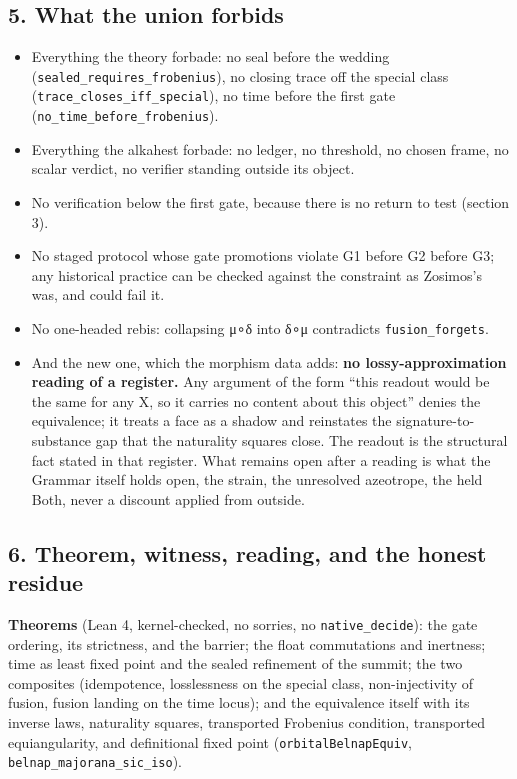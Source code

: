 \hypertarget{what-the-union-forbids}{%
\subsection{5. What the union forbids}\label{what-the-union-forbids}}

\begin{itemize}
\tightlist
\item
  Everything the theory forbade: no seal before the wedding
  (\texttt{sealed\_requires\_frobenius}), no closing trace off the
  special class (\texttt{trace\_closes\_iff\_special}), no time before
  the first gate (\texttt{no\_time\_before\_frobenius}).
\item
  Everything the alkahest forbade: no ledger, no threshold, no chosen
  frame, no scalar verdict, no verifier standing outside its object.
\item
  No verification below the first gate, because there is no return to
  test (section 3).
\item
  No staged protocol whose gate promotions violate G1 before G2 before
  G3; any historical practice can be checked against the constraint as
  Zosimos's was, and could fail it.
\item
  No one-headed rebis: collapsing μ∘δ into δ∘μ contradicts
  \texttt{fusion\_forgets}.
\item
  And the new one, which the morphism data adds: \textbf{no
  lossy-approximation reading of a register.} Any argument of the form
  ``this readout would be the same for any X, so it carries no content
  about this object'' denies the equivalence; it treats a face as a
  shadow and reinstates the signature-to-substance gap that the
  naturality squares close. The readout is the structural fact stated in
  that register. What remains open after a reading is what the Grammar
  itself holds open, the strain, the unresolved azeotrope, the held
  Both, never a discount applied from outside.
\end{itemize}

\hypertarget{theorem-witness-reading-and-the-honest-residue}{%
\subsection{6. Theorem, witness, reading, and the honest
residue}\label{theorem-witness-reading-and-the-honest-residue}}

\textbf{Theorems} (Lean 4, kernel-checked, no sorries, no
\texttt{native\_decide}): the gate ordering, its strictness, and the
barrier; the float commutations and inertness; time as least fixed point
and the sealed refinement of the summit; the two composites
(idempotence, losslessness on the special class, non-injectivity of
fusion, fusion landing on the time locus); and the equivalence itself
with its inverse laws, naturality squares, transported Frobenius
condition, transported equiangularity, and definitional fixed point
(\texttt{orbitalBelnapEquiv}, \texttt{belnap\_majorana\_sic\_iso}).

